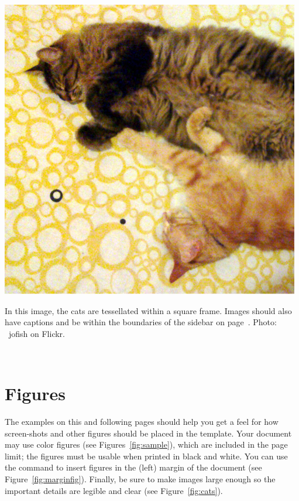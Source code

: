 \documentclass{sigchi-ext}
\begin{document}

\begin{marginfigure}[-35pc]
  \begin{minipage}{\marginparwidth}
    \centering
    \includegraphics[width=0.9\marginparwidth]{figures/cats}
    \caption{In this image, the cats are tessellated within a square
      frame. Images should also have captions and be within the
      boundaries of the sidebar on page~\pageref{sec:sidebar}. Photo:
      \cczero~jofish on Flickr.}~\label{fig:marginfig}
  \end{minipage}
\end{marginfigure}

\section{Figures}
The examples on this and following pages should help you get a feel
for how screen-shots and other figures should be placed in the
template. Your document may use color figures (see
Figures~\ref{fig:sample}), which are included in the page limit; the
figures must be usable when printed in black and white. You can use
the \texttt{\marginpar} command to insert figures in the (left) margin
of the document (see Figure~\ref{fig:marginfig}). Finally, be sure to
make images large enough so the important details are legible and
clear (see Figure~\ref{fig:cats}).
\end{document}
